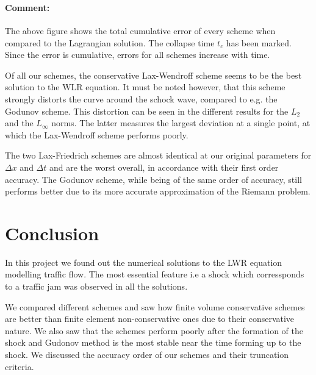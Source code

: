 \documentclass[11pt]{article}
\begin{document}
    \begin{center}
    \end{center}
    { \hspace*{\fill} \\}
    
    \begin{center}
    \end{center}
    { \hspace*{\fill} \\}
    
    \paragraph{Comment:}\label{comment}

The above figure shows the total cumulative error of every scheme when
compared to the Lagrangian solution. The collapse time \(t_c\) has been
marked. Since the error is cumulative, errors for all schemes increase
with time.

Of all our schemes, the conservative Lax-Wendroff scheme seems to be the
best solution to the WLR equation. It must be noted however, that this
scheme strongly distorts the curve around the schock wave, compared to
e.g. the Godunov scheme. This distortion can be seen in the different
results for the \(L_2\) and the \(L_\infty\) norms. The latter measures
the largest deviation at a single point, at which the Lax-Wendroff
scheme performs poorly.

The two Lax-Friedrich schemes are almost identical at our original
parameters for \(\Delta x\) and \(\Delta t\) and are the worst overall,
in accordance with their first order accuracy. The Godunov scheme, while
being of the same order of accuracy, still performs better due to its
more accurate approximation of the Riemann problem.


\section{Conclusion}
In this project we found out the numerical solutions to the LWR equation modelling traffic flow. The most essential feature i.e a shock which corressponds to a traffic jam was observed in all the solutions.

We compared different schemes and saw how finite volume conservative schemes are better than finite element non-conservative ones due to their conservative nature. We also saw that the schemes perform poorly after the formation of the shock and Gudonov method is the most stable near the time forming up to the shock. We discussed the accuracy order of our schemes and their truncation criteria.
    
    
    
    
\end{document}
